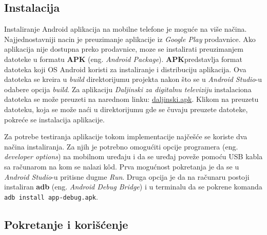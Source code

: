 \documentclass[implementacija.tex]{subfiles}
\begin{document}
\subsection{Instalacija}
Instaliranje Android aplikacija na mobilne telefone je moguće na više načina. Najjednostavniji nacin je preuzimanje aplikacije iz \textit{Google Play} prodavnice. Ako aplikacija nije dostupna preko prodavnice, moze se instalirati preuzimanjem datoteke u formatu \textbf{APK} (eng. \textit{Android Package}). \textbf{APK}predstavlja format datoteka koji OS Android koristi za instaliranje i distribuciju aplikacija. Ova datoteka se kreira u \textit{build} direktorijumu projekta nakon što se u \textit{Android Studio}-u odabere opcija \textit{build}. Za aplikaciju \textit{Daljinski za digitalnu televiziju} instalaciona datoteka se može preuzeti na narednom linku: \hyperlink{https://drive.google.com/file/d/1gBlfRibn4jrFDe3TTBCsHUq9MDowEBty/view?usp=drive_link}{daljinski.apk}. Klikom na preuzetu datoteku, koja se može naći u direktorijumu gde se čuvaju preuzete datoteke, pokreće se instalacija aplikacije.

Za potrebe testiranja aplikacije tokom implementacije najčešće se koriste dva načina instaliranja. Za njih je potrebno omogućiti opcije programera (eng. \textit{developer options}) na mobilnom uređaju i da se uređaj poveže pomoću USB kabla sa računarom na kom se nalazi k\^{o}d. Prva mogućnost pokretanja je da se u \textit{Android Studio}-u pritisne dugme \textit{Run}. Druga opcija je da na računaru postoji instaliran \textbf{adb} (eng. \textit{Android Debug Bridge}) i u terminalu da se pokrene komanda \verb|adb install app-debug.apk|. 

\subsection{Pokretanje i korišćenje}
\end{document}
